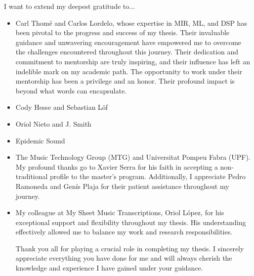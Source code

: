 

\begin{acknowledgement}

I want to extend my deepest gratitude to...

\begin{itemize}
\item Carl Thomé and Carlos Lordelo, whose expertise in MIR, ML, and DSP has been pivotal to the progress and success of my thesis. Their invaluable guidance and unwavering encouragement have empowered me to overcome the challenges encountered throughout this journey. Their dedication and commitment to mentorship are truly inspiring, and their influence has left an indelible mark on my academic path. The opportunity to work under their mentorship has been a privilege and an honor. Their profound impact is beyond what words can encapsulate.

\vspace*{3mm}
\item Cody Hesse and Sebastian Löf

\vspace*{3mm}
\item Oriol Nieto and J. Smith

\vspace*{3mm}
\item Epidemic Sound

\vspace*{3mm}
\item The Music Technology Group (MTG) and Universitat Pompeu Fabra (UPF). My profound thanks go to Xavier Serra for his faith in accepting a non-traditional profile to the master's program. Additionally, I appreciate Pedro Ramoneda and Genís Plaja for their patient assistance throughout my journey.

\vspace*{3mm}
\item My colleague at My Sheet Music Transcriptions, Oriol López, for his exceptional support and flexibility throughout my thesis. His understanding effectively allowed me to balance my work and research responsibilities.

\vspace*{3mm}

Thank you all for playing a crucial role in completing my thesis. I sincerely appreciate everything you have done for me and will always cherish the knowledge and experience I have gained under your guidance.

\vspace*{3mm}
\end{itemize}

\newpage
\end{acknowledgement}